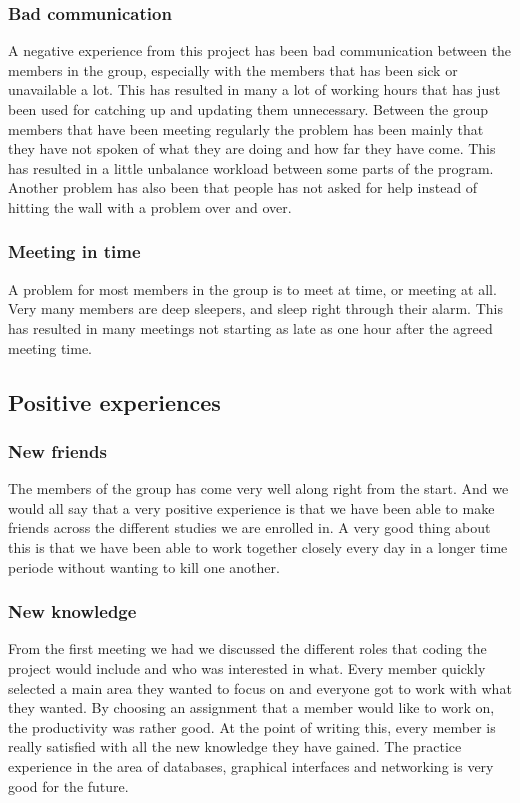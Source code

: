 \documentclass[a4paper, 10pt]{article}
\begin{document}
\subsubsection{Bad communication}
A negative experience from this project has been bad communication between the members in the group, especially with the members that has been sick or unavailable a lot. This has resulted in many a lot of working hours that has just been used for catching up and updating them unnecessary. Between the group members that have been meeting regularly the problem has been mainly that they have not spoken of what they are doing and how far they have come. This has resulted in a little unbalance workload between some parts of the program. Another problem has also been that people has not asked for help instead of hitting the wall with a problem over and over.
\subsubsection{Meeting in time}
A problem for most members in the group is to meet at time, or meeting at all. Very many members are deep sleepers, and sleep right through their alarm. This has resulted in many meetings not starting as late as one hour after the agreed meeting time.

\subsection{Positive experiences}
\subsubsection{New friends}
The members of the group has come very well along right from the start. And we would all say that a very positive experience is that we have been able to make friends across the different studies we are enrolled in. A very good thing about this is that we have been able to work together closely every day in a longer time periode without wanting to kill one another.

\subsubsection{New knowledge}
From the first meeting we had we discussed the different roles that coding the project would include and who was interested in what. Every member quickly selected a main area they wanted to focus on and everyone got to work with what they wanted. By choosing an assignment that a member would like to work on, the productivity was rather good. At the point of writing this, every member is really satisfied with all the new knowledge they have gained. The practice experience in the area of databases, graphical interfaces and networking is very good for the future.
\end{document}
